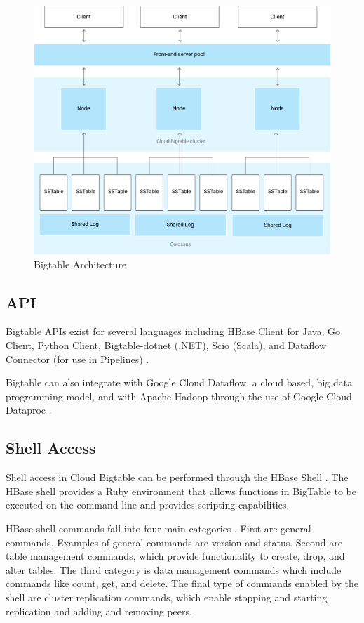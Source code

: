 \documentclass[9pt,twocolumn,twoside]{styles/osajnl}
\begin{document}
\begin{figure}[ht]
  \includegraphics[scale=0.45]{images/bigtable-architecture.jpg}
  \caption{Bigtable Architecture \cite{www-bigtabledocoverview}}
\end{figure}

\subsection{API}

Bigtable APIs exist for several languages including HBase Client for Java, Go Client, Python Client, Bigtable-dotnet (.NET), Scio (Scala), and Dataflow Connector (for use in Pipelines) \cite{www-bigtabledocapi}.

Bigtable can also integrate with Google Cloud Dataflow, a cloud based, big data programming model, and with Apache Hadoop through the use of Google Cloud Dataproc \cite{www-bigtabledocapi}.

\subsection{Shell Access}


Shell access in Cloud Bigtable can be performed through the HBase Shell \cite{www-hbaseshell}. The HBase shell provides a Ruby environment that allows functions in BigTable to be executed on the command line and provides scripting capabilities. 

HBase shell commands fall into four main categories \cite{www-hbaseshell2}.  First are general commands.  Examples of general commands are version and status.  Second are table management commands, which provide functionality to create, drop, and alter tables.  The third category is data management commands which include commands like count, get, and delete.  The final type of commands enabled by the shell are cluster replication commands, which enable stopping and starting replication and adding and removing peers.
\end{document}
